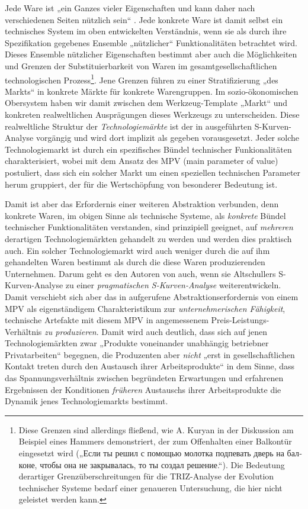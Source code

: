 \documentclass[12pt,a4paper]{article}
\begin{document}
Jede Ware ist „ein Ganzes vieler Eigenschaften und kann daher nach
verschiedenen Seiten nützlich sein“ \cite[S. 49]{MEW23}. Jede konkrete Ware
ist damit selbst ein technisches System im oben entwickelten Verständnis, wenn
sie als durch ihre Spezifikation gegebenes Ensemble „nützlicher“
Funktionalitäten betrachtet wird. Dieses Ensemble nützlicher Eigenschaften
bestimmt aber auch die Möglichkeiten und Grenzen der Substituierbarkeit von
Waren im gesamtgesellschaftlichen technologischen Prozess\footnote{Diese
  Grenzen sind allerdings fließend, wie A. Kuryan in der Diskussion
  \cite{Graebe2019b} am Beispiel eines Hammers demonstriert, der zum
  Offenhalten einer Balkontür eingesetzt wird (\foreignlanguage{russian}{„Если
    ты решил с помощью молотка подпевать дверь на балконе, чтобы она не
    закрывалась, то ты создал решение.“}). Die Bedeutung derartiger
  Grenzüberschreitungen für die TRIZ-Analyse der Evolution technischer Systeme
  bedarf einer genaueren Untersuchung, die hier nicht geleistet werden kann.}.
Jene Grenzen führen zu einer Stratifizierung „des Markts“ in konkrete Märkte
für konkrete Warengruppen. Im sozio-ökonomischen Obersystem haben wir damit
zwischen dem Werkzeug-Template „Markt“ und konkreten realweltlichen
Ausprägungen dieses Werkzeugs zu unterscheiden. Diese realweltliche Struktur
der \emph{Technologiemärkte} ist der in \cite{TESE2018} ausgeführten
S-Kurven-Analyse vorgängig und wird dort implizit als gegeben vorausgesetzt.
Jeder solche Technologiemarkt ist durch ein spezifisches Bündel technischer
Funkionalitäten charakterisiert, wobei \cite{TESE2018} mit dem Ansatz des MPV
(main parameter of value) postuliert, dass sich ein solcher Markt um einen
speziellen technischen Parameter herum gruppiert, der für die Wertschöpfung
von besonderer Bedeutung ist.

Damit ist aber das Erfordernis einer weiteren Abstraktion verbunden, denn
konkrete Waren, im obigen Sinne als technische Systeme, als \emph{konkrete}
Bündel technischer Funktionalitäten verstanden, sind prinzipiell geeignet, auf
\emph{mehreren} derartigen Technologiemärkten gehandelt zu werden und werden
dies praktisch auch. Ein solcher Technologiemarkt wird auch weniger durch die
auf ihm gehandelten Waren bestimmt als durch die diese Waren produzierenden
Unternehmen. Darum geht es den Autoren von \cite{TESE2018} auch, wenn sie
Altschullers S-Kurven-Analyse zu einer \emph{pragmatischen S-Kurven-Analyse}
weiterentwickeln.  Damit verschiebt sich aber das in \cite{TESE2018}
aufgerufene Abstraktionserfordernis von einem MPV als eigenständigem
Charakteristikum zur \emph{unternehmerischen Fähigkeit}, technische Artefakte
mit diesem MPV in angemessenem Preis-Leistungs-Verhältnis \emph{zu
  produzieren}.  Damit wird auch deutlich, dass sich auf jenen
Technologiemärkten zwar „Produkte voneinander unabhängig betriebner
Privatarbeiten“ begegnen, die Produzenten aber \emph{nicht} „erst in
gesellschaftlichen Kontakt treten durch den Austausch ihrer Arbeitsprodukte“
\cite[S. 87]{MEW23} in dem Sinne, dass das Spannungsverhältnis zwischen
begründeten Erwartungen und erfahrenen Ergebnissen der Konditionen
\emph{früheren} Austauschs ihrer Arbeitsprodukte die Dynamik jenes
Technologiemarkts bestimmt.  
\enlargethispage{1em}
\end{document}

